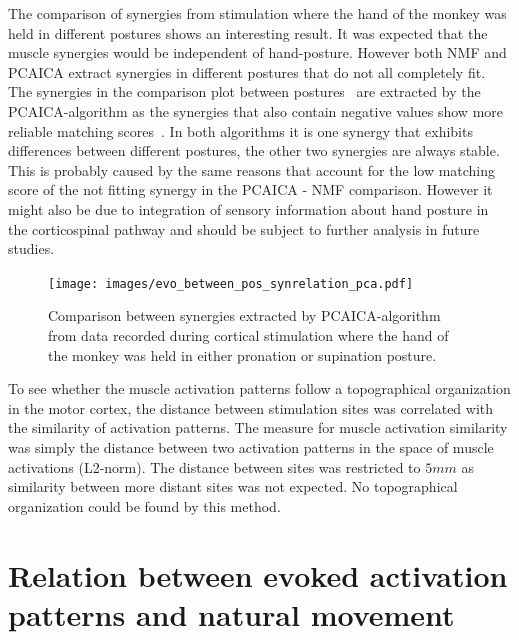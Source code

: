 The comparison of synergies from stimulation where the hand of the monkey was held in different postures shows
an interesting result. It was expected that the muscle synergies would be independent of hand-posture. 
However both NMF and PCAICA extract synergies in different postures that do not all completely fit. 
The synergies in the comparison plot between postures~ are extracted
by the PCAICA-algorithm as the synergies that also contain negative values show more reliable matching scores~.
In both algorithms it is one synergy that exhibits differences between different postures, the other two synergies
are always stable. This is probably caused by the same reasons that account for the low matching score of the 
not fitting synergy in the PCAICA - NMF comparison. However it might also be due to integration of sensory
information about hand posture in the corticospinal pathway and should be subject to further analysis in future studies. 
\begin{figure}[ht]
	\centering
		\texttt{[image: images/evo\_between\_pos\_synrelation\_pca.pdf]}
	\caption{Comparison between synergies extracted by PCAICA-algorithm from data recorded during cortical stimulation
	where the hand of the monkey was held in either pronation or supination posture.}
	\label{sg:fig:images_evo_between_pos_synrelation_pca}
\end{figure}


To see whether the muscle activation patterns follow a topographical organization in the motor cortex,
the distance between stimulation sites was correlated with the similarity of activation patterns.
The measure for muscle activation similarity was simply the distance between two activation patterns
in the space of muscle activations (L2-norm). The distance between sites was restricted to $5 mm$ as similarity
between more distant sites was not expected. No topographical organization could be found by this method.







\section{Relation between evoked activation patterns and natural movement} %
\label{sg:sec:synergy_relations}

